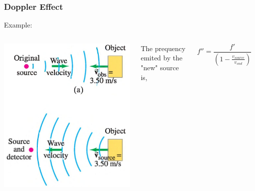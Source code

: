\documentclass[]{beamer}
\begin{document}
\begin{frame}
\frametitle{Doppler Effect}

Example: 

\vspace{3mm}

   \begin{columns}[c]
   \column{2in}  %
  \begin{center}
  \includegraphics[height=2.in]{images4/doppler7.jpg}
\end{center}


  
   \column{2in}


The prequency emited by the "new" source is,

\begin{equation*}
f''=\frac{f'}{(1-\frac{v_{source}}{v_{snd}})}
\end{equation*}

   \end{columns}




  \end{frame}
\end{document}

